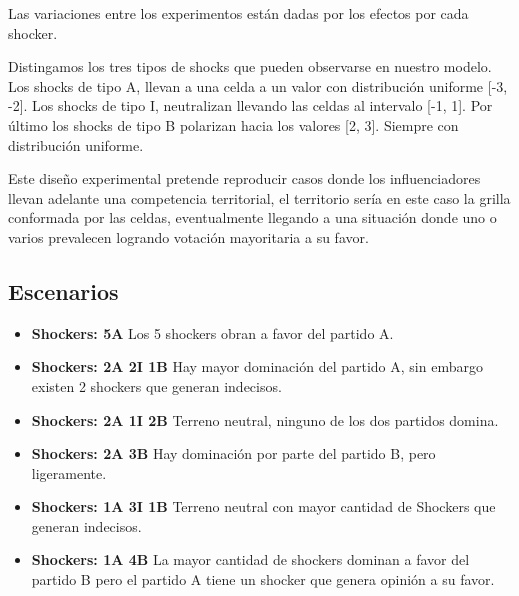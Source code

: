 Las variaciones entre los experimentos están dadas por los efectos por cada shocker.

Distingamos los tres tipos de shocks que pueden observarse en nuestro modelo.
Los shocks de tipo A, llevan a una celda a un valor con distribución
uniforme [-3, -2]. Los shocks de tipo I, neutralizan
llevando las celdas al intervalo  [-1, 1]. Por último los shocks de tipo B
polarizan hacia los valores [2, 3]. Siempre con distribución uniforme.

Este diseño experimental pretende reproducir casos donde los influenciadores
llevan adelante una competencia territorial, el territorio sería en este caso la grilla conformada por las celdas, eventualmente llegando a una
situación donde uno o varios prevalecen logrando votación mayoritaria a su favor.

\subsection{Escenarios} %
\label{sub:Escenarios}

\begin{itemize}
    \item \textbf{Shockers: 5A} Los 5 shockers obran a favor del partido A.
    \item \textbf{Shockers: 2A 2I 1B} Hay mayor dominación del partido A, sin embargo existen 2 shockers que generan indecisos.
    \item \textbf{Shockers: 2A 1I 2B} Terreno neutral, ninguno de los dos partidos domina.
    \item \textbf{Shockers: 2A 3B} Hay dominación por parte del partido B, pero ligeramente.
    \item \textbf{Shockers: 1A 3I 1B} Terreno neutral con mayor cantidad de Shockers que generan indecisos.
    \item \textbf{Shockers: 1A 4B} La mayor cantidad de shockers dominan a favor del partido B pero el partido A tiene un shocker que genera opinión a su favor.  
\end{itemize}

